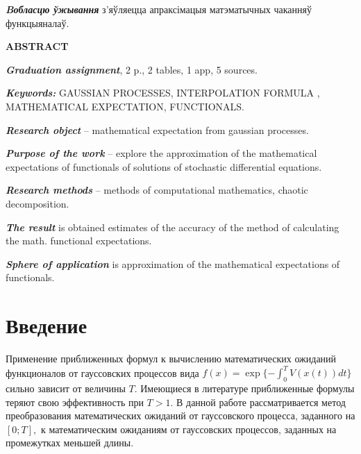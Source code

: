 \documentclass [12pt]{report}
\begin{document}
\emph{\textbf{Bобласцю ўжывання}} з'яўляецца апраксімацыя матэматычных чаканняў функцыяналаў.

\begin{center}
	\textbf{ABSTRACT}
\end{center}

\emph{\textbf{Graduation assignment}}, 2 p., 2 tables, 1 app, 5 sources.

\emph{\textbf{Keywords:}} GAUSSIAN PROCESSES, INTERPOLATION FORMULA , MATHEMATICAL EXPECTATION, FUNCTIONALS.

\emph{\textbf{Research object}} -- mathematical expectation from gaussian processes.

\emph{\textbf{Purpose of the work}} -- explore the approximation of the mathematical expectations of functionals of solutions of stochastic differential equations.

\emph{\textbf{Research methods}} -- methods of computational mathematics, chaotic decomposition.

\emph{\textbf{The result}} is obtained estimates of the accuracy of the method of calculating the math. functional expectations.

\emph{\textbf{Sphere of application }}is approximation of the mathematical expectations of functionals.

\renewcommand\contentsname{Содержание}
\tableofcontents{}

\newpage

\chapter*{Введение}

Применение приближенных формул к вычислению математических ожиданий
функционалов от гауссовских процессов вида
$ f(x) = \exp\{-\int_{0}^{T}V(x(t))dt\} $
сильно зависит от величины $T. $ Имеющиеся в литературе приближенные формулы
теряют свою эффективность при $T > 1.$
В данной работе рассматривается метод преобразования
математических ожиданий от гауссовского процесса, заданного на $[0;T],$
к математическим ожиданиям от гауссовских процессов, заданных на
промежутках меньшей длины.
\end{document}
